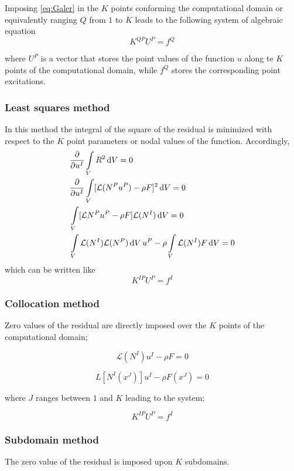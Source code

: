 Imposing \cref{eq:Galer} in the $K$ points conforming the computational domain or equivalently ranging $Q$ from $1$ to $K$ leads to the following system of algebraic equation
\begin{equation}
{K^{QP}}{U^P} = {f^Q}
\label{eq:DGaler}
\end{equation}

where $U^P$ is a vector that stores the point values of the function $u$ along te $K$ points of the computational domain, while $f^Q$ stores the corresponding point excitations.

\subsubsection{Least squares method}
In this method the integral of the square of the residual is minimized with respect to the $K$ point parameters or nodal values of the function. Accordingly,
\begin{align*}
  &\pdv{u^I}\int\limits_V R^2 \dd{V} = 0\\
  &\pdv{u^I}\int\limits_V [\mathcal{L}(N^P u^P) - \rho F]^2 \dd{V} = 0\\
  &\int\limits_V [\mathcal{L} N^P u^P - \rho F] \mathcal{L}(N^I) \dd{V} = 0\\
  &\int\limits_V \mathcal{L}(N^I) \mathcal{L}(N^P) \dd{V} u^P - \rho \int\limits_V \mathcal{L}(N^I) F \dd{V} = 0
\end{align*}
which can be written like
\begin{equation}
  K^{IP} U^P = f^I
  \label{eq:Dsquares}
\end{equation}

\subsubsection{Collocation method}
Zero values of the residual are directly imposed over the $K$ points of the computational domain;

\[\mathcal{L}({N^I}){u^I} - \rho F = 0\]

\[L[{N^I}({x^J})]{u^I} - \rho F({x^J}) = 0\]

where $J$ ranges between $1$ and $K$ leading to the system;

\begin{equation}
{K^{IP}}{U^P} = {f^I}
\label{eq:Colo}
\end{equation}

\subsubsection{Subdomain method}
The zero value of the residual is imposed upon $K$ subdomains.

